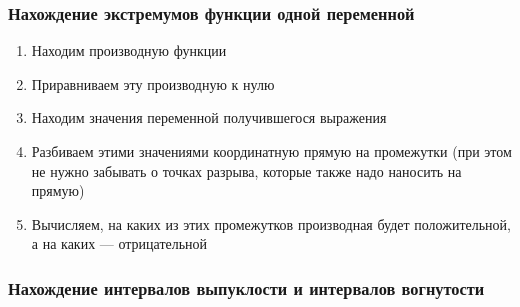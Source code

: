 \documentclass{article}
\begin{document}
\begin{multienumerate}
\end{multienumerate}

\subsubsection{Нахождение экстремумов функции одной переменной}

\begin{enumerate}
    \item Находим производную функции
    \item Приравниваем эту производную к нулю
    \item Находим значения переменной получившегося выражения
    \item Разбиваем этими значениями координатную прямую на промежутки (при этом не нужно забывать о точках разрыва, которые также надо наносить на прямую)
    \item Вычисляем, на каких из этих промежутков производная будет положительной, а на каких — отрицательной
\end{enumerate}

\subsubsection{Нахождение интервалов выпуклости и интервалов вогнутости}
\end{document}
